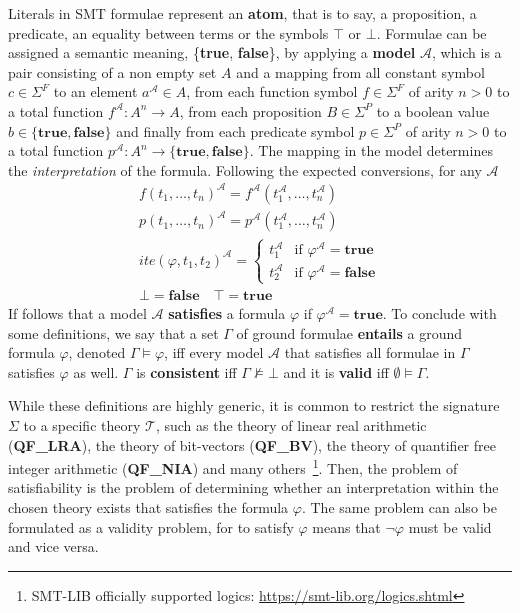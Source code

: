 \documentclass[runningheads]{llncs}
\begin{document}
Literals in SMT formulae represent an \textbf{atom}, that is to say, a proposition, a predicate, an equality between terms or the symbols $\top$ or $\bot$.
Formulae can be assigned a semantic meaning, \{\textbf{true}, \textbf{false}\}, by applying a \textbf{model} $\mathcal{A}$, which is a pair consisting of a non empty set $A$ and a mapping from all constant symbol $c \in \Sigma^F$ to an element $a^\mathcal{A} \in A$, from each function symbol $f \in \Sigma^F$ of arity $n > 0$ to a total function $f^\mathcal{A} : A^n \to A$, from each proposition $B \in \Sigma^{P}$ to a boolean value $b \in \{\textbf{true}, \textbf{false}\}$ and finally from each predicate symbol $p \in \Sigma^P$ of arity $n > 0$ to a total function $p^\mathcal{A} : A^n \to \{ \textbf{true}, \textbf{false} \}$.
The mapping in the model determines the \textit{interpretation} of the formula.
Following the expected conversions, for any $\mathcal{A}$
\begin{gather*}
    f(t_1, \dots, t_n)^{\mathcal{A}} = f^{\mathcal{A}}(t_1^{\mathcal{A}}, \dots, t_n^{\mathcal{A}}) \\
    p(t_1, \dots, t_n)^{\mathcal{A}} = p^{\mathcal{A}}(t_1^{\mathcal{A}}, \dots, t_n^{\mathcal{A}}) \\
    ite(\varphi, t_1, t_2)^{\mathcal{A}} = \begin{cases}
        t_1^{\mathcal{A}} & \text{if } \varphi^{\mathcal{A}} = \textbf{true}  \\
        t_2^{\mathcal{A}} & \text{if } \varphi^{\mathcal{A}} = \textbf{false}
    \end{cases} \\
    \bot = \textbf{false} \quad \top = \textbf{true}
\end{gather*}
If follows that a model $\mathcal{A}$ \textbf{satisfies} a formula $\varphi$ if $\varphi^{\mathcal{A}} = \textbf{true}$.
To conclude with some definitions, we say that a set $\Gamma$ of ground formulae \textbf{entails} a ground formula $\varphi$, denoted $\Gamma \models \varphi$, iff every model $\mathcal{A}$ that satisfies all formulae in $\Gamma$ satisfies $\varphi$ as well.
$\Gamma$ is \textbf{consistent} iff $\Gamma \not\models \bot$ and it is \textbf{valid} iff $\emptyset \models \Gamma$.

While these definitions are highly generic, it is common to restrict the signature $\Sigma$ to a specific theory $\mathcal{T}$, such as the theory of linear real arithmetic (\textbf{QF\_LRA}), the theory of bit-vectors (\textbf{QF\_BV}), the theory of quantifier free integer arithmetic (\textbf{QF\_NIA}) and many others~\footnote{SMT-LIB officially supported logics: \url{https://smt-lib.org/logics.shtml}}.
Then, the problem of satisfiability is the problem of determining whether an interpretation within the chosen theory exists that satisfies the formula $\varphi$.
The same problem can also be formulated as a validity problem, for to satisfy $\varphi$ means that $\neg\varphi$ must be valid and vice versa.
\end{document}
